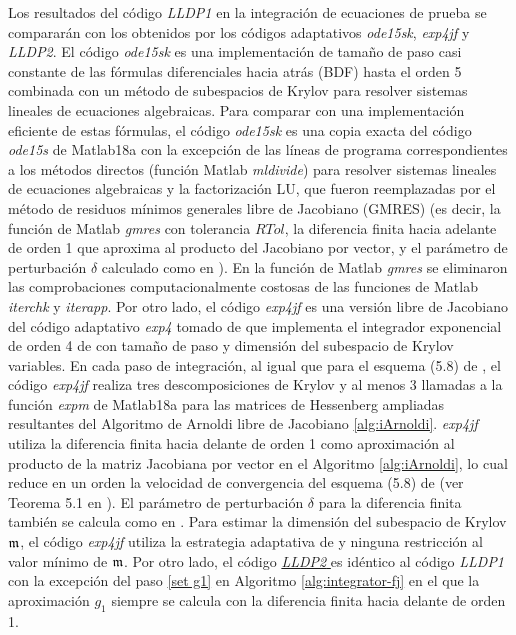 Los resultados del código \emph{LLDP1} en la integración de ecuaciones de prueba se compararán con los obtenidos por los códigos adaptativos \emph{ode15sk}, \emph{exp4jf} y \emph{LLDP2}. El código \emph{ode15sk} es una implementación de tamaño de paso casi constante de las fórmulas diferenciales hacia atrás (BDF) hasta el orden 5 combinada con un método de subespacios de Krylov para resolver sistemas lineales de ecuaciones algebraicas. Para comparar con una implementación eficiente de estas fórmulas, el código \emph{ode15sk} es una copia exacta del código \emph{ode15s} \cite{shampine1997matlab} de Matlab18a con la excepción de las líneas de programa correspondientes a los métodos directos (función Matlab \emph{mldivide}) para resolver sistemas lineales de ecuaciones algebraicas y la factorización LU, que fueron reemplazadas por el método de residuos mínimos generales libre de Jacobiano (GMRES) (es decir, la función de Matlab \emph{gmres} con tolerancia $RTol$, la diferencia finita  hacia adelante de orden 1 que aproxima al producto del Jacobiano por  vector, y el parámetro de perturbación $\delta$ calculado como en \cite{knoll2004jacobian}). En la función de Matlab \emph{gmres} se eliminaron las comprobaciones computacionalmente costosas de las funciones de Matlab \emph{iterchk} y \emph{iterapp}. Por otro lado, el código \emph{exp4jf} es una versión libre de Jacobiano del código adaptativo \emph{exp4} tomado de \cite{jansing2011expode} que implementa el integrador exponencial de orden 4 de \cite{hochbruck1998exponential} con tamaño de paso y dimensión del subespacio de Krylov variables.
En cada paso de integración, al igual que para el esquema (5.8) de \cite{hochbruck1998exponential}, el código \textit{exp4jf} realiza tres descomposiciones de Krylov y al menos 3 llamadas a la función \emph{expm} de Matlab18a para las matrices de Hessenberg ampliadas resultantes del Algoritmo de Arnoldi libre de Jacobiano \ref{alg:iArnoldi}. \textit{exp4jf} utiliza la diferencia finita hacia delante de orden 1 como aproximación al producto de la matriz Jacobiana por vector en el Algoritmo \ref{alg:iArnoldi}, lo cual reduce en un orden la velocidad de convergencia del esquema (5.8) de \cite{hochbruck1998exponential} (ver Teorema 5.1 en \cite{hochbruck1998exponential}).
El parámetro de perturbación $\delta$ para la diferencia finita también se calcula como en \cite{knoll2004jacobian}. Para estimar la dimensión del subespacio de Krylov $\mathfrak{m}$, el código \textit{exp4jf} utiliza la estrategia adaptativa de \cite{hochbruck1998exponential} y ninguna restricción al valor mínimo de $\mathfrak{m}$. Por otro lado, el código \href{https://github.com/fsadannn/JF-LLDPschemes}{{\emph{LLDP2} \faExternalLink}} es idéntico al código \emph{LLDP1} con la excepción del paso \ref{set g1} en Algoritmo \ref{alg:integrator-fj} en el que la aproximación $g_1$ siempre se calcula con la diferencia finita hacia delante de orden 1. 

